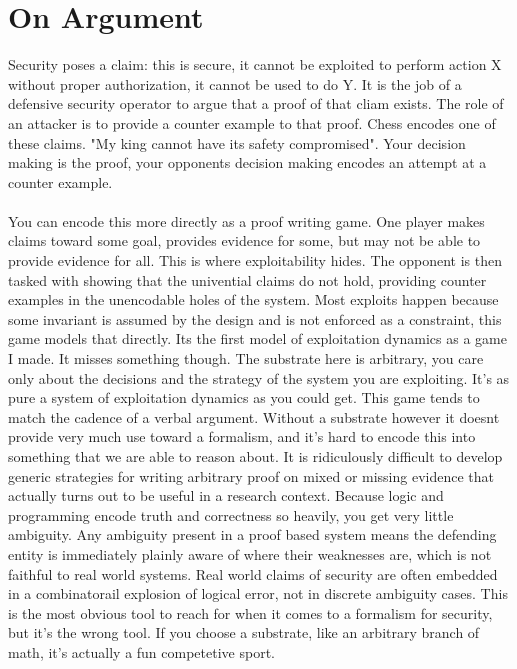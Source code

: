 \documentclass{article}
\begin{document}
	\section{On Argument}
	Security poses a claim: this is secure, it cannot be exploited to perform action X without proper authorization, it cannot be used to do Y. It is the job of a defensive security operator to argue that a proof of that cliam exists. The role of an attacker is to provide a counter example to that proof. Chess encodes one of these claims. "My king cannot have its safety compromised". Your decision making is the proof, your opponents decision making encodes an attempt at a counter example.\\\\
	You can encode this more directly as a proof writing game. One player makes claims toward some goal, provides evidence for some, but may not be able to provide evidence for all. This is where exploitability hides. The opponent is then tasked with showing that the univential claims do not hold, providing counter examples in the unencodable holes of the system. Most exploits happen because some invariant is assumed by the design and is not enforced as a constraint, this game models that directly. Its the first model of exploitation dynamics as a game I made. It misses something though. The substrate here is arbitrary, you care only about the decisions and the strategy of the system you are exploiting. It's as pure a system of exploitation dynamics as you could get. This game tends to match the cadence of a verbal argument. Without a substrate however it doesnt provide very much use toward a formalism, and it's hard to encode this into something that we are able to reason about. It is ridiculously difficult to develop generic strategies for writing arbitrary proof on mixed or missing evidence that actually turns out to be useful in a research context. Because logic and programming encode truth and correctness so heavily, you get very little ambiguity. Any ambiguity present in a proof based system means the defending entity is immediately plainly aware of where their weaknesses are, which is not faithful to real world systems. Real world claims of security are often embedded in a combinatorail explosion of logical error, not in discrete ambiguity cases. This is the most obvious tool to reach for when it comes to a formalism for security, but it's the wrong tool. If you choose a substrate, like an arbitrary branch of math, it's actually a fun competetive sport. 
\end{document}
